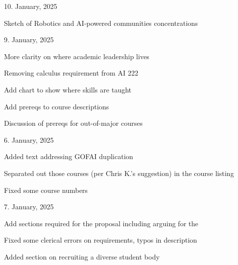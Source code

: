 
10. January, 2025
\begin{itemize*}
  \item Sketch of Robotics and AI-powered communities concentrations
\end{itemize*}

9. January, 2025

\begin{itemize*}
  \item More clarity on where academic leadership lives
  \item Removing calculus requirement from AI 222
  \item Add chart to show where skills are taught
  \item Add prereqs to course descriptions
  \item Discussion of prereqs for out-of-major courses
\end{itemize*}

6. January, 2025

\begin{itemize*}
    \item Added text addressing GOFAI duplication
    \item Separated out those courses (per Chris K.'s suggestion) in the course listing
    \item Fixed some course numbers
\end{itemize*}

7. January, 2025

\begin{itemize*}
    \item Add sections required for the  proposal including arguing for the 
    \item Fixed some clerical errors on requirements, typos in description
    \item Added section on recruiting a diverse student body
\end{itemize*}